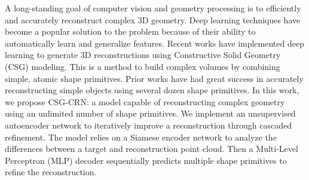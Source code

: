 
A long-standing goal of computer vision and geometry processing is to efficiently and accurately reconstruct complex 3D geometry. Deep learning techniques have become a popular solution to the problem because of their ability to automatically learn and generalize features. Recent works have implemented deep learning to generate 3D reconstructions using Constructive Solid Geometry (CSG) modeling. This is a method to build complex volumes by combining simple, atomic shape primitives. Prior works have had great success in accurately reconstructing simple objects using several dozen shape primitives. In this work, we propose CSG-CRN: a model capable of reconstructing complex geometry using an unlimited number of shape primitives. We implement an unsupervised autoencoder network to iteratively improve a reconstruction through cascaded refinement. The model relies on a Siamese encoder network to analyze the differences between a target and reconstruction point cloud. Then a Multi-Level Perceptron (MLP) decoder sequentially predicts multiple shape primitives to refine the reconstruction.

\vspace{2em}

